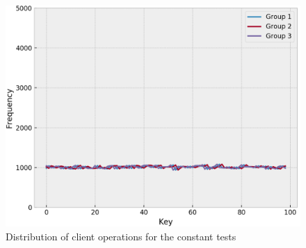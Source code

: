 \begin{figure}[!htb]
  \centering
  \includegraphics[width=\textwidth,height=\textheight,keepaspectratio]{img/clients_loads_constant.png}
  \caption{ Distribution of client operations for the constant tests }
  \label{fig:constant-skewed-loads}
\end{figure}




